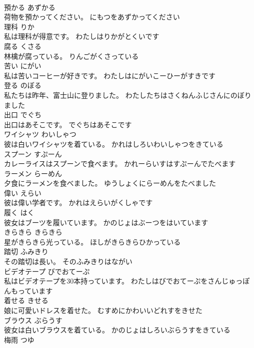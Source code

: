\documentclass[8pt]{extreport}
\begin{document}
\begin{CJK}{UTF8}{min}
\\	預かる	あずかる	
\\	荷物を預かってください。	にもつをあずかってください	
\\	理科	りか	
\\	私は理科が得意です。	わたしはりかがとくいです	
\\	腐る	くさる	
\\	林檎が腐っている。	りんごがくさっている	
\\	苦い	にがい	
\\	私は苦いコーヒーが好きです。	わたしはにがいこーひーがすきです	
\\	登る	のぼる	
\\	私たちは昨年、富士山に登りました。	わたしたちはさくねんふじさんにのぼりました	
\\	出口	でぐち	
\\	出口はあそこです。	でぐちはあそこです	
\\	ワイシャツ	わいしゃつ	
\\	彼は白いワイシャツを着ている。	かれはしろいわいしゃつをきている	
\\	スプーン	すぷーん	
\\	カレーライスはスプーンで食べます。	かれーらいすはすぷーんでたべます	
\\	ラーメン	らーめん	
\\	夕食にラーメンを食べました。	ゆうしょくにらーめんをたべました	
\\	偉い	えらい	
\\	彼は偉い学者です。	かれはえらいがくしゃです	
\\	履く	はく	
\\	彼女はブーツを履いています。	かのじょはぶーつをはいています	
\\	きらきら	きらきら	
\\	星がきらきら光っている。	ほしがきらきらひかっている	
\\	踏切	ふみきり	
\\	その踏切は長い。	そのふみきりはながい	
\\	ビデオテープ	びでおてーぷ	
\\	私はビデオテープを30本持っています。	わたしはびでおてーぷをさんじゅっぽんもっています	
\\	着せる	きせる	
\\	娘に可愛いドレスを着せた。	むすめにかわいいどれすをきせた	
\\	ブラウス	ぶらうす	
\\	彼女は白いブラウスを着ている。	かのじょはしろいぶらうすをきている	
\\	梅雨	つゆ	

\end{CJK}
\end{document}
